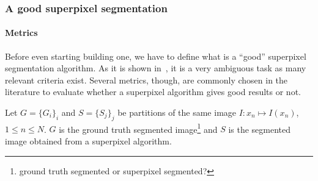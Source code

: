 \documentclass{article}
\begin{document}
        \subsubsection{A good superpixel segmentation}
            \paragraph{Metrics}
            Before even starting building one, we have to define what is a ``good'' superpixel segmentation algorithm. As it is shown in~\cite{stutz_2017}, it is a very ambiguous task as many relevant criteria exist. Several metrics, though, are commonly chosen in the literature to evaluate whether a superpixel algorithm gives good results or not.

            Let $G = \{G_i\}_i$ and $S = \{S_j\}_j$ be partitions of the same image $I : x_n \mapsto I(x_n)$, $1 \leq n \leq N$. $G$ is the ground truth segmented image\footnote{ground truth segmented or superpixel segmented?} and $S$ is the segmented image obtained from a superpixel algorithm.
\end{document}
